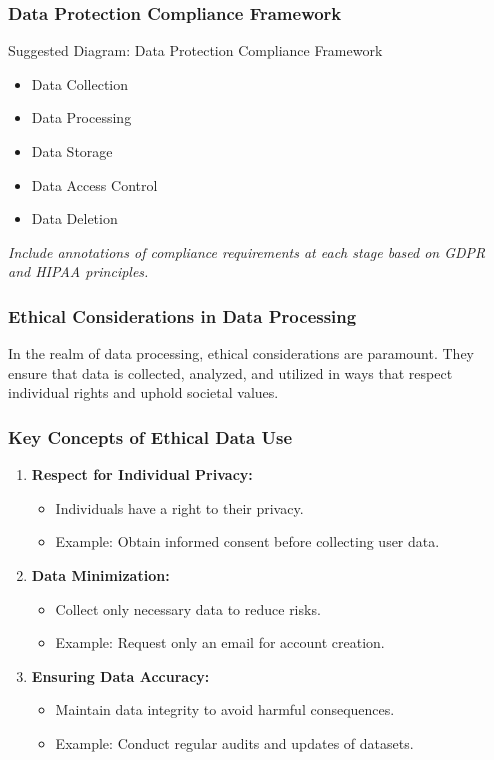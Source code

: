 \documentclass{beamer}
\begin{document}
\begin{frame}[fragile]
    \frametitle{Data Protection Compliance Framework}

    Suggested Diagram: Data Protection Compliance Framework
    \begin{itemize}
        \item Data Collection
        \item Data Processing
        \item Data Storage
        \item Data Access Control
        \item Data Deletion
    \end{itemize}
    \textit{Include annotations of compliance requirements at each stage based on GDPR and HIPAA principles.}
\end{frame}

\begin{frame}[fragile]
    \frametitle{Ethical Considerations in Data Processing}
    In the realm of data processing, ethical considerations are paramount. They ensure that data is collected, analyzed, and utilized in ways that respect individual rights and uphold societal values.
\end{frame}

\begin{frame}[fragile]
    \frametitle{Key Concepts of Ethical Data Use}
    \begin{enumerate}
        \item \textbf{Respect for Individual Privacy:}
            \begin{itemize}
                \item Individuals have a right to their privacy.
                \item Example: Obtain informed consent before collecting user data.
            \end{itemize}
        
        \item \textbf{Data Minimization:}
            \begin{itemize}
                \item Collect only necessary data to reduce risks.
                \item Example: Request only an email for account creation.
            \end{itemize}
        
        \item \textbf{Ensuring Data Accuracy:}
            \begin{itemize}
                \item Maintain data integrity to avoid harmful consequences.
                \item Example: Conduct regular audits and updates of datasets.
            \end{itemize}
    \end{enumerate}
\end{frame}
\end{document}

